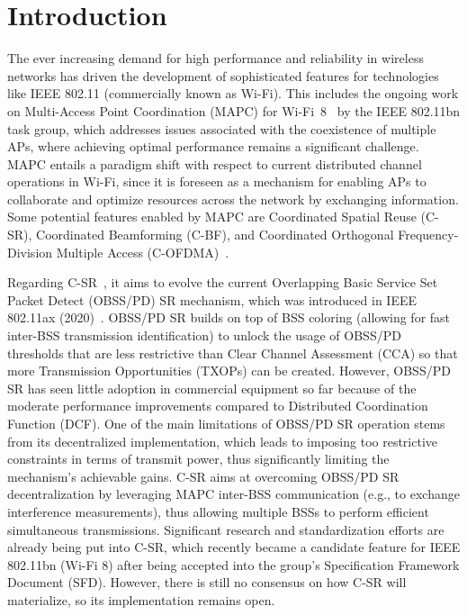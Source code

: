 \section{Introduction}
\label{sec:introduction}

The ever increasing demand for high performance and reliability in wireless networks has driven the development of sophisticated features for technologies like IEEE 802.11 (commercially known as Wi-Fi). This includes the ongoing work on Multi-Access Point Coordination (MAPC) for Wi-Fi~8~\cite{reshef2022future} by the IEEE 802.11bn task group, which addresses issues associated with the coexistence of multiple APs, where achieving optimal performance remains a significant challenge. MAPC entails a paradigm shift with respect to current distributed channel operations in Wi-Fi, since it is foreseen as a mechanism for enabling APs to collaborate and optimize resources across the network by exchanging information. Some potential features enabled by MAPC are Coordinated Spatial Reuse (C-SR), Coordinated Beamforming (C-BF), and Coordinated Orthogonal Frequency-Division Multiple Access (C-OFDMA)~\cite{verma2023survey}.

Regarding C-SR~\cite{wilhelmi2023throughput}, it aims to evolve the current Overlapping Basic Service Set Packet Detect (OBSS/PD) SR mechanism, which was introduced in IEEE 802.11ax (2020)~\cite{wilhelmi2021spatial}. OBSS/PD SR builds on top of BSS coloring (allowing for fast inter-BSS transmission identification) to unlock the usage of OBSS/PD thresholds that are less restrictive than Clear Channel Assessment (CCA) so that more Transmission Opportunities (TXOPs) can be created. However, OBSS/PD SR has seen little adoption in commercial equipment so far because of the moderate performance improvements compared to Distributed Coordination Function (DCF). One of the main limitations of OBSS/PD SR operation stems from its decentralized implementation, which leads to imposing too restrictive constraints in terms of transmit power, thus significantly limiting the mechanism's achievable gains. C-SR aims at overcoming OBSS/PD SR decentralization by leveraging MAPC inter-BSS communication (e.g., to exchange interference measurements), thus allowing multiple BSSs to perform efficient simultaneous transmissions. Significant research and standardization efforts are already being put into C-SR, which recently became a candidate feature for IEEE 802.11bn (Wi-Fi 8) after being accepted into the group's Specification Framework Document (SFD). However, there is still no consensus on how C-SR will materialize, so its implementation remains open.

